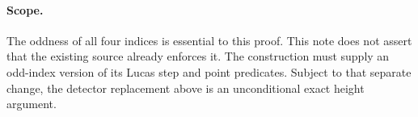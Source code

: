 \documentclass[11pt]{article}
\begin{document}
\paragraph{Scope.}
The oddness of all four indices is essential to this proof. This note
does not assert that the existing source already enforces it. The
construction must supply an odd-index version of its Lucas step and
point predicates. Subject to that separate change, the detector
replacement above is an unconditional exact height argument.
\end{document}
